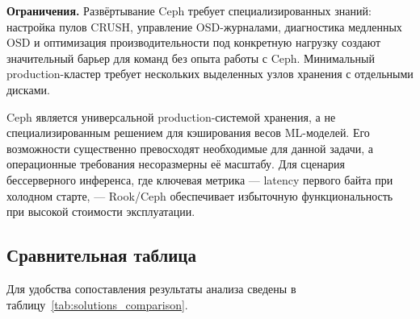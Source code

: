 \textbf{Ограничения.} Развёртывание Ceph требует специализированных знаний: настройка пулов CRUSH, управление OSD-журналами, диагностика медленных OSD и оптимизация производительности под конкретную нагрузку создают значительный барьер для команд без опыта работы с Ceph. Минимальный production-кластер требует нескольких выделенных узлов хранения с отдельными дисками.

Ceph является универсальной production-системой хранения, а не специализированным решением для кэширования весов ML-моделей. Его возможности существенно превосходят необходимые для данной задачи, а операционные требования несоразмерны её масштабу. Для сценария бессерверного инференса, где ключевая метрика --- latency первого байта при холодном старте, --- Rook/Ceph обеспечивает избыточную функциональность при высокой стоимости эксплуатации.

\subsection{Сравнительная таблица}
\label{sec:comparison_table}

Для удобства сопоставления результаты анализа сведены в таблицу~\ref{tab:solutions_comparison}.

